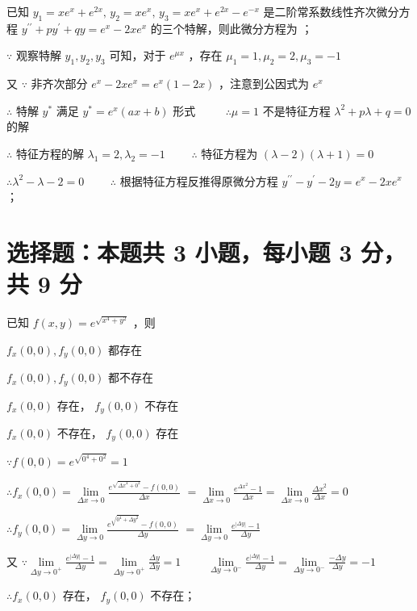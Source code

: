 \begin{question}
    已知 $y_1 = xe^x + e^{2x}, \, y_2 = xe^x, \, y_3 = xe^x + e^{2x} - e^{-x}$ 是二阶常系数线性齐次微分方程
    $y^{\prime\prime} + py^{\prime} + qy = e^x - 2xe^x$ 的三个特解，则此微分方程为
    \fillin[$y^{\prime\prime} - y^{\prime} - 2y = e^x - 2xe^x$]；
\end{question}
\begin{solution}
    $\because$ 观察特解 $y_1, y_2, y_3$ 可知，对于 $e^{\mu x}$ ，存在 $\mu_1 = 1, \mu_2 = 2, \mu_3 = -1$

    又 $\because$ 非齐次部分 $e^x - 2xe^x = e^x(1 - 2x)$ ，注意到公因式为 $e^x$

    $\therefore$ 特解 $y^*$ 满足 $y^* = e^x(ax + b)$ 形式 $\qquad$
    $\therefore \mu = 1$ 不是特征方程 $\lambda^2 + p\lambda + q = 0$ 的解

    $\therefore$ 特征方程的解 $\lambda_1 = 2, \lambda_2 = -1 \qquad$
    $\therefore$ 特征方程为 $(\lambda - 2)(\lambda + 1) = 0$

    $\therefore \lambda^2 - \lambda - 2 = 0 \qquad$
    $\therefore$ 根据特征方程反推得原微分方程 $y^{\prime\prime} - y^{\prime} - 2y = e^x - 2xe^x$；
\end{solution}

\section{选择题：本题共 3 小题，每小题 3 分，共 9 分}

\begin{question}[points = 3]
    已知 $f(x, y) = e^{\sqrt{x^4 + y^2}}$ ，则 \,\paren[C]
\end{question}
\begin{choices}
    \item $f_x(0, 0), f_y(0, 0)$ 都存在
    \item $f_x(0, 0), f_y(0, 0)$ 都不存在
    \item $f_x(0, 0)$ 存在， $f_y(0, 0)$ 不存在
    \item $f_x(0, 0)$ 不存在， $f_y(0, 0)$ 存在
\end{choices}
\begin{solution}
    $\because f(0, 0) = e^{\sqrt{0^4 + 0^2}} = 1$

    $\therefore f_x(0, 0) = \lim\limits_{\Delta x \to 0} \frac{e^{\sqrt{{\Delta x}^4 + 0^2}} - f(0, 0)}{\Delta x}$
    $= \lim\limits_{\Delta x \to 0} \frac{e^{{\Delta x}^2} - 1}{\Delta x} = \lim\limits_{\Delta x \to 0} \frac{{\Delta x}^2}{\Delta x} = 0$

    $\therefore f_y(0, 0) = \lim\limits_{\Delta y \to 0} \frac{e^{\sqrt{0^4 + {\Delta y}^2}} - f(0, 0)}{\Delta y}$
    $= \lim\limits_{\Delta y \to 0} \frac{e^{ |\Delta y| } - 1}{\Delta y}$

    又 $\because \lim\limits_{\Delta y \to 0^+} \frac{e^{ |\Delta y| } - 1}{\Delta y} = \lim\limits_{\Delta y \to 0^+} \frac{\Delta y}{\Delta y} = 1 \qquad$
    $\lim\limits_{\Delta y \to 0^-} \frac{e^{ |\Delta y| } - 1}{\Delta y} = \lim\limits_{\Delta y \to 0^-} \frac{-\Delta y}{\Delta y} = -1$

    $\therefore f_x(0, 0)$ 存在， $f_y(0, 0)$ 不存在；
\end{solution}

